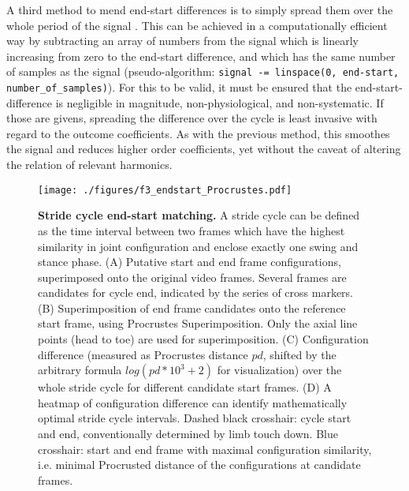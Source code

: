 A third method to mend end-start differences is to simply spread them over the whole period of the signal \citep{Mielke2019}.
This can be achieved in a computationally efficient way by subtracting an array of numbers from the signal which is linearly increasing from zero to the end-start difference, and which has the same number of samples as the signal (pseudo-algorithm: \texttt{signal -= linspace(0, end-start, number\_of\_samples)}).
For this to be valid, it must be ensured that the end-start-difference is negligible in magnitude, non-physiological, and non-systematic.
If those are givens, spreading the difference over the cycle is least invasive with regard to the outcome coefficients.
As with the previous method, this smoothes the signal and reduces higher order coefficients, yet without the caveat of altering the relation of relevant harmonics.



\begin{figure}[p]
\centering
\texttt{[image: ./figures/f3\_endstart\_Procrustes.pdf]}
\caption{\label{fig:endstart}\textbf{Stride cycle end-start matching.} A stride cycle can be defined as the time interval between two frames which have the highest similarity in joint configuration and enclose exactly one swing and stance phase. (A) Putative start and end frame configurations, superimposed onto the original video frames. Several frames are candidates for cycle end, indicated by the series of cross markers. (B) Superimposition of end frame candidates onto the reference start frame, using Procrustes Superimposition. Only the axial line points (head to toe) are used for superimposition. (C) Configuration difference (measured as Procrustes distance \(pd\), shifted by the arbitrary formula \(log\left(pd*10^3+2\right)\) for visualization) over the whole stride cycle for different candidate start frames. (D) A heatmap of configuration difference can identify mathematically optimal stride cycle intervals. Dashed black crosshair: cycle start and end, conventionally determined by limb touch down. Blue crosshair: start and end frame with maximal configuration similarity, i.e. minimal Procrusted distance of the configurations at candidate frames.}
\end{figure}

